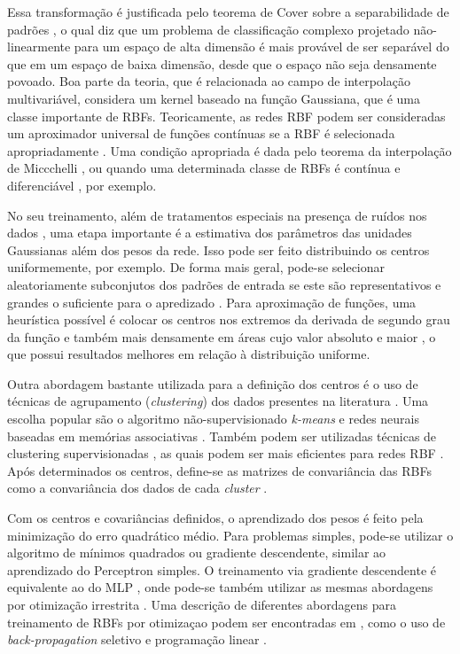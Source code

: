 \documentclass[conference]{IEEEtran}
\begin{document}
	Essa transformação é justificada pelo teorema de Cover sobre a separabilidade de padrões \cite{cover1965geometrical}, o qual diz que um problema de classificação complexo projetado não-linearmente para um espaço de alta dimensão é mais provável de ser separável do que em um espaço de baixa dimensão, desde que o espaço não seja densamente povoado. Boa parte da teoria, que é relacionada ao campo de interpolação multivariável, considera um kernel baseado na função Gaussiana, que é uma classe importante de RBFs. Teoricamente, as redes RBF podem ser consideradas um aproximador universal de funções contínuas se a RBF é selecionada apropriadamente \cite{poggio1990networks, park1991universal, liao2003relaxed}. Uma condição apropriada é dada pelo teorema da interpolação de Miccchelli \cite{micchelli1986interpolation}, ou quando uma determinada classe de RBFs é contínua e diferenciável \cite{park1991universal}, por exemplo.
	 
	No seu treinamento, além de tratamentos especiais na presença de ruídos nos dados \cite{broomhead1988radial}, uma etapa importante é a estimativa dos parâmetros das unidades Gaussianas além dos pesos da rede. Isso pode ser feito distribuindo os centros uniformemente, por exemplo. De forma mais geral, pode-se selecionar aleatoriamente subconjutos dos padrões de entrada se este são representativos e grandes o suficiente para o apredizado \cite{wu2012using}. Para aproximação de funções, uma heurística possível é colocar os centros nos extremos da derivada de segundo grau da função e também mais densamente em áreas cujo valor absoluto e maior \cite{sanchez1995second}, o que possui resultados melhores em relação à distribuição uniforme.
	
	Outra abordagem bastante utilizada para a definição dos centros é o uso de técnicas de agrupamento (\textit{clustering}) dos dados presentes na literatura \cite{du2006neural, du2010clustering}.  Uma escolha popular são o algoritmo não-supervisionado \textit{k-means} \cite{moody1989fast} e redes neurais baseadas em memórias associativas \cite{kohonen2012self}. Também podem ser utilizadas técnicas de clustering supervisionadas \cite{chen1993hybrid}, as quais podem ser mais eficientes para redes RBF \cite{wu2012using}. Após determinados os centros, define-se as matrizes de convariância das RBFs como a convariância dos dados de cada \textit{cluster} \cite{wu2012using}. 
	
	Com os centros e covariâncias definidos, o aprendizado dos pesos é feito pela minimização do erro quadrático médio. Para problemas simples, pode-se utilizar o algoritmo de mínimos quadrados ou gradiente descendente, similar ao aprendizado do Perceptron simples. O treinamento via gradiente descendente é equivalente ao do MLP \cite{wettschereck1992improving}, onde pode-se também utilizar as mesmas abordagens por otimização irrestrita \cite{du2006neural}.	Uma descrição de diferentes abordagens para treinamento de RBFs por otimizaçao podem ser encontradas em \cite{wu2012using}, como o uso de \textit{back-propagation} seletivo \cite{vakil2004training} e programação linear \cite{roy1995algorithm}.
	
\end{document}
